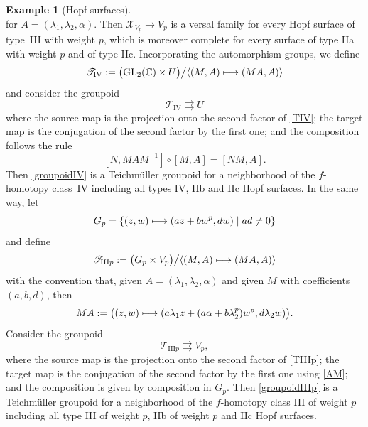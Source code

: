 \documentclass[10pt]{amsart}
\let\mathcal\mathscr
\def\mto{\mathchoice{\longmapsto}{\mapsto}{\mapsto}{\mapsto}}
\newcommand{\GL}{\mathrm{GL}}
\theoremstyle{plain}
\theoremstyle{definition}
\newtheorem{example}[theorem]{Example}
\theoremstyle{remark}
\numberwithin{equation}{section}
\newcommand{\CC}{{\mathbb{C}}}
\begin{document}
\begin{example}[Hopf surfaces]
\begin{equation}
\end{equation}
for $A=(\lambda_1,\lambda_2,\alpha)$. Then $\mathcal X_{V_p}\to V_p$ is a versal family for every Hopf surface of type~III with weight $p$, which is moreover complete for every surface of type IIa with weight $p$ and of type IIc. Incorporating the automorphism groups, we define
\begin{equation}
\label{TIV}
\mathcal T_\mathrm{IV}:=\big (\GL_2(\CC)\times U\big )\big / \langle (M,A)\mto (MA, A)\rangle
\end{equation}
and consider the groupoid
\begin{equation}
\label{groupoidIV}
\mathcal T_\mathrm{IV}\rightrightarrows U
\end{equation}
where the source map is the projection onto the second factor of \eqref{TIV}; the target map is the conjugation of the second factor by the first one; and the composition follows the rule
\begin{equation}
\label{compIV}
[N,MAM^{-1}]\circ[M,A]=[NM,A].
\end{equation}
Then \eqref{groupoidIV} is a Teichmüller groupoid for a neighborhood of the $f$-homotopy class~IV including all types IV, IIb and IIc Hopf surfaces. In the same way, let
\begin{equation}
\label{Gp}
G_p=\{(z,w)\mto (az+bw^p, dw)\mid ad\not =0\}
\end{equation}
and define
\begin{equation}
\label{TIIIp}
\mathcal T_{\mathrm{III}p}:=\big (G_p\times V_p\big )\big / \langle (M,A)\mto (MA, A)\rangle
\end{equation}
with the convention that, given $A=(\lambda_1,\lambda_2,\alpha)$ and given $M$ with coefficients $(a,b,d)$, then
\begin{equation}
\label{AM}
MA:=\big ((z,w)\mto (a\lambda_1 z+(a\alpha + b\lambda_2^p)w^p,d\lambda_2 w)\big ).
\end{equation}
Consider the groupoid
\begin{equation}
\label{groupoidIIIp}
\mathcal T_{\mathrm{III}p}\rightrightarrows V_p,
\end{equation}
where the source map is the projection onto the second factor of \eqref{TIIIp}; the target map is the conjugation of the second factor by the first one using \eqref{AM}; and the composition is given by composition in $G_p$.
Then \eqref{groupoidIIIp} is a Teichmüller groupoid for a neighborhood of the $f$-homotopy class III of weight $p$ including all type III of weight $p$, IIb of weight $p$ and IIc Hopf surfaces.


\end{example}
\end{document}
